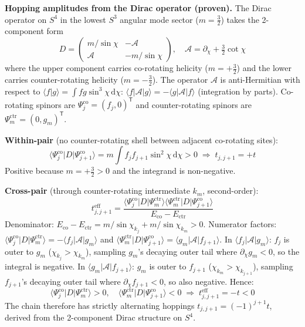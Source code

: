 \documentclass[12pt,a4paper]{article}
\begin{document}
\textbf{Hopping amplitudes from the Dirac operator (proven).}
The Dirac operator on $S^4$ in the lowest $S^3$ angular mode sector ($m = \tfrac{3}{2}$)
takes the 2-component form
\begin{equation}
  D = \begin{pmatrix} m/\sin\chi & -\mathcal{A} \\
      \mathcal{A} & -m/\sin\chi \end{pmatrix}, \quad
  \mathcal{A} = \partial_\chi + \tfrac{3}{2}\cot\chi
  \label{eq:Dirac2comp}
\end{equation}
where the upper component carries co-rotating helicity ($m=+\tfrac{3}{2}$) and the
lower carries counter-rotating helicity ($m=-\tfrac{3}{2}$). The operator $\mathcal{A}$
is anti-Hermitian with respect to $\langle f|g\rangle = \int f g \sin^3\!\chi\,
\mathrm{d}\chi$: $\langle f|\mathcal{A}|g\rangle = -\langle g|\mathcal{A}|f\rangle$
(integration by parts). Co-rotating spinors are $\Psi_j^\mathrm{co}=(f_j,0)^\mathsf{T}$
and counter-rotating spinors are $\Psi_m^\mathrm{ctr}=(0,g_m)^\mathsf{T}$.

\textbf{Within-pair} (no counter-rotating shell between adjacent co-rotating sites):
\begin{equation}
  \langle\Psi_j^\mathrm{co}|D|\Psi_{j+1}^\mathrm{co}\rangle
  = m\int f_j f_{j+1}\sin^2\!\chi\,\mathrm{d}\chi > 0
  \;\Rightarrow\; t_{j,j+1} = +t
\end{equation}
Positive because $m=+\tfrac{3}{2}>0$ and the integrand is non-negative.

\textbf{Cross-pair} (through counter-rotating intermediate $k_m$, second-order):
\begin{equation}
  t_{j,j+1}^\mathrm{eff}
  = \frac{\langle\Psi_j^\mathrm{co}|D|\Psi_m^\mathrm{ctr}\rangle
    \langle\Psi_m^\mathrm{ctr}|D|\Psi_{j+1}^\mathrm{co}\rangle}
    {E_\mathrm{co}-E_\mathrm{ctr}}
\end{equation}
Denominator: $E_\mathrm{co}-E_\mathrm{ctr} = m/\sin\chi_{k_j} + m/\sin\chi_{k_m} > 0$.
Numerator factors: $\langle\Psi_j^\mathrm{co}|D|\Psi_m^\mathrm{ctr}\rangle =
-\langle f_j|\mathcal{A}|g_m\rangle$ and $\langle\Psi_m^\mathrm{ctr}|D|
\Psi_{j+1}^\mathrm{co}\rangle = \langle g_m|\mathcal{A}|f_{j+1}\rangle$.
In $\langle f_j|\mathcal{A}|g_m\rangle$: $f_j$ is outer to $g_m$ ($\chi_{k_j}>\chi_{k_m}$),
sampling $g_m$'s decaying outer tail where $\partial_\chi g_m < 0$, so the integral is
negative. In $\langle g_m|\mathcal{A}|f_{j+1}\rangle$: $g_m$ is outer to $f_{j+1}$
($\chi_{k_m}>\chi_{k_{j+1}}$), sampling $f_{j+1}$'s decaying outer tail where
$\partial_\chi f_{j+1} < 0$, so also negative. Hence:
\begin{equation}
  \langle\Psi_j^\mathrm{co}|D|\Psi_m^\mathrm{ctr}\rangle > 0,\quad
  \langle\Psi_m^\mathrm{ctr}|D|\Psi_{j+1}^\mathrm{co}\rangle < 0
  \;\Rightarrow\; t_{j,j+1}^\mathrm{eff} = -t < 0
  \label{eq:cross_sign}
\end{equation}
The chain therefore has strictly alternating hoppings $t_{j,j+1}=(-1)^{j+1}t$,
derived from the 2-component Dirac structure on $S^4$.
\end{document}
